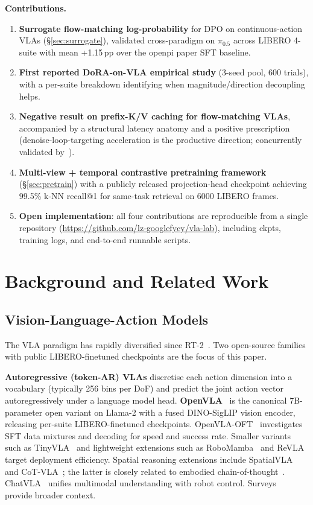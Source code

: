 \documentclass{article}
\begin{document}
\textbf{Contributions.}
\begin{enumerate}
  \item \textbf{Surrogate flow-matching log-probability} for DPO on continuous-action VLAs (\S\ref{sec:surrogate}), validated cross-paradigm on \(\pi_{0.5}\) across LIBERO 4-suite with mean +1.15\,pp over the openpi paper SFT baseline.
  \item \textbf{First reported DoRA-on-VLA empirical study} (3-seed pool, 600 trials), with a per-suite breakdown identifying when magnitude/direction decoupling helps.
  \item \textbf{Negative result on prefix-K/V caching for flow-matching VLAs}, accompanied by a structural latency anatomy and a positive prescription (denoise-loop-targeting acceleration is the productive direction; concurrently validated by~\cite{snapflow2026}).
  \item \textbf{Multi-view + temporal contrastive pretraining framework} (\S\ref{sec:pretrain}) with a publicly released projection-head checkpoint achieving 99.5\% k-NN recall@1 for same-task retrieval on 6000 LIBERO frames.
  \item \textbf{Open implementation}: all four contributions are reproducible from a single repository (\url{https://github.com/lz-googlefycy/vla-lab}), including ckpts, training logs, and end-to-end runnable scripts.
\end{enumerate}

\section{Background and Related Work}

\subsection{Vision-Language-Action Models}

The VLA paradigm has rapidly diversified since RT-2~\cite{brohan2023rt2}. Two open-source families with public LIBERO-finetuned checkpoints are the focus of this paper.

\textbf{Autoregressive (token-AR) VLAs} discretise each action dimension into a vocabulary (typically 256 bins per DoF) and predict the joint action vector autoregressively under a language model head. \textbf{OpenVLA}~\cite{kim2024openvla} is the canonical 7B-parameter open variant on Llama-2 with a fused DINO-SigLIP vision encoder, releasing per-suite LIBERO-finetuned checkpoints. OpenVLA-OFT~\cite{kim2025openvlaoft} investigates SFT data mixtures and decoding for speed and success rate. Smaller variants such as TinyVLA~\cite{wen2024tinyvla} and lightweight extensions such as RoboMamba~\cite{robomamba2024} and ReVLA~\cite{revla2024} target deployment efficiency. Spatial reasoning extensions include SpatialVLA~\cite{spatialvla2025} and CoT-VLA~\cite{cotvla2025}; the latter is closely related to embodied chain-of-thought~\cite{ecot2024}. ChatVLA~\cite{chatvla2025} unifies multimodal understanding with robot control. Surveys~\cite{vla2025survey,vla2026embodied} provide broader context.
\end{document}
